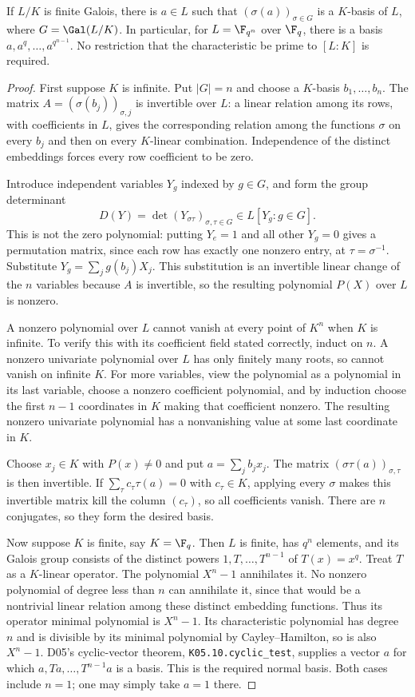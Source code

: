 \begin{theorem}
If $L/K$ is finite Galois, there is $a\in L$ such that $(\sigma(a))_{\sigma\in G}$ is a $K$-basis of $L$, where $G=\Gal(L/K)$. In particular, for $L=\F_{q^n}$ over $\F_q$, there is a basis $a,a^q,\ldots,a^{q^{n-1}}$. No restriction that the characteristic be prime to $[L:K]$ is required.
\end{theorem}
\begin{proof}
First suppose $K$ is infinite. Put $|G|=n$ and choose a $K$-basis $b_1,\ldots,b_n$. The matrix $A=(\sigma(b_j))_{\sigma,j}$ is invertible over $L$: a linear relation among its rows, with coefficients in $L$, gives the corresponding relation among the functions $\sigma$ on every $b_j$ and then on every $K$-linear combination. Independence of the distinct embeddings forces every row coefficient to be zero.

Introduce independent variables $Y_g$ indexed by $g\in G$, and form the group determinant
\[D(Y)=\det(Y_{\sigma\tau})_{\sigma,\tau\in G}\in L[Y_g:g\in G].\]
This is not the zero polynomial: putting $Y_e=1$ and all other $Y_g=0$ gives a permutation matrix, since each row has exactly one nonzero entry, at $\tau=\sigma^{-1}$. Substitute $Y_g=\sum_j g(b_j)X_j$. This substitution is an invertible linear change of the $n$ variables because $A$ is invertible, so the resulting polynomial $P(X)$ over $L$ is nonzero.

A nonzero polynomial over $L$ cannot vanish at every point of $K^n$ when $K$ is infinite. To verify this with its coefficient field stated correctly, induct on $n$. A nonzero univariate polynomial over $L$ has only finitely many roots, so cannot vanish on infinite $K$. For more variables, view the polynomial as a polynomial in its last variable, choose a nonzero coefficient polynomial, and by induction choose the first $n-1$ coordinates in $K$ making that coefficient nonzero. The resulting nonzero univariate polynomial has a nonvanishing value at some last coordinate in $K$.

Choose $x_j\in K$ with $P(x)\ne0$ and put $a=\sum_j b_jx_j$. The matrix $(\sigma\tau(a))_{\sigma,\tau}$ is then invertible. If $\sum_\tau c_\tau\tau(a)=0$ with $c_\tau\in K$, applying every $\sigma$ makes this invertible matrix kill the column $(c_\tau)$, so all coefficients vanish. There are $n$ conjugates, so they form the desired basis.

Now suppose $K$ is finite, say $K=\F_q$. Then $L$ is finite, has $q^n$ elements, and its Galois group consists of the distinct powers $1,T,\ldots,T^{n-1}$ of $T(x)=x^q$. Treat $T$ as a $K$-linear operator. The polynomial $X^n-1$ annihilates it. No nonzero polynomial of degree less than $n$ can annihilate it, since that would be a nontrivial linear relation among these distinct embedding functions. Thus its operator minimal polynomial is $X^n-1$. Its characteristic polynomial has degree $n$ and is divisible by its minimal polynomial by Cayley--Hamilton, so is also $X^n-1$. D05's cyclic-vector theorem, \texttt{K05.10.cyclic\_test}, supplies a vector $a$ for which $a,Ta,\ldots,T^{n-1}a$ is a basis. This is the required normal basis. Both cases include $n=1$; one may simply take $a=1$ there.
\end{proof}
